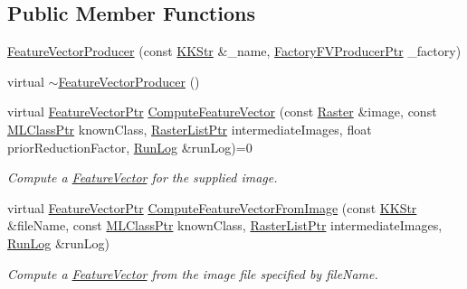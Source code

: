 \subsection*{Public Member Functions}
\begin{DoxyCompactItemize}
\item 
\hyperlink{class_k_k_m_l_l_1_1_feature_vector_producer_a1d60d2cfe0d160215ae44a6c8aa0f10a}{Feature\+Vector\+Producer} (const \hyperlink{class_k_k_b_1_1_k_k_str}{K\+K\+Str} \&\+\_\+name, \hyperlink{namespace_k_k_m_l_l_a82812d1feb85a6cff72d059bc67bb90e}{Factory\+F\+V\+Producer\+Ptr} \+\_\+factory)
\item 
virtual \hyperlink{class_k_k_m_l_l_1_1_feature_vector_producer_a0b3ad70beec643d048e1116e6d6411dd}{$\sim$\+Feature\+Vector\+Producer} ()
\item 
virtual \hyperlink{namespace_k_k_m_l_l_a0c5df3d48f45926fbc4fee04f5e3bc04}{Feature\+Vector\+Ptr} \hyperlink{class_k_k_m_l_l_1_1_feature_vector_producer_a8f93296a46432624867b12ed8631df0f}{Compute\+Feature\+Vector} (const \hyperlink{class_k_k_b_1_1_raster}{Raster} \&image, const \hyperlink{namespace_k_k_m_l_l_ac272393853d59e72e8456f14cd6d8c23}{M\+L\+Class\+Ptr} known\+Class, \hyperlink{namespace_k_k_b_a5369c086484e7d77bcb87b0b8aa7193d}{Raster\+List\+Ptr} intermediate\+Images, float prior\+Reduction\+Factor, \hyperlink{class_k_k_b_1_1_run_log}{Run\+Log} \&run\+Log)=0
\begin{DoxyCompactList}\small\item\em Compute a \hyperlink{class_k_k_m_l_l_1_1_feature_vector}{Feature\+Vector} for the supplied \textquotesingle{}image\textquotesingle{}. \end{DoxyCompactList}\item 
virtual \hyperlink{namespace_k_k_m_l_l_a0c5df3d48f45926fbc4fee04f5e3bc04}{Feature\+Vector\+Ptr} \hyperlink{class_k_k_m_l_l_1_1_feature_vector_producer_adc404332c064c2c22542e8d26b561673}{Compute\+Feature\+Vector\+From\+Image} (const \hyperlink{class_k_k_b_1_1_k_k_str}{K\+K\+Str} \&file\+Name, const \hyperlink{namespace_k_k_m_l_l_ac272393853d59e72e8456f14cd6d8c23}{M\+L\+Class\+Ptr} known\+Class, \hyperlink{namespace_k_k_b_a5369c086484e7d77bcb87b0b8aa7193d}{Raster\+List\+Ptr} intermediate\+Images, \hyperlink{class_k_k_b_1_1_run_log}{Run\+Log} \&run\+Log)
\begin{DoxyCompactList}\small\item\em Compute a \hyperlink{class_k_k_m_l_l_1_1_feature_vector}{Feature\+Vector} from the image file specified by \textquotesingle{}file\+Name\textquotesingle{}. \end{DoxyCompactList}\item 

\end{DoxyCompactItemize}

